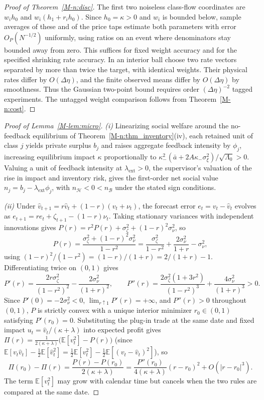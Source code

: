 \documentclass[12pt]{article}
\theoremstyle{definition}
\theoremstyle{remark}
\newcommand{\E}{\mathbb{E}}
\begin{document}
\begin{proof}[Proof of Theorem~\ref{M-n:disc}]
The first two noiseless class-flow coordinates are $w_i h_0$ and $w_i(h_1+r_i h_0)$. Since $h_0=\kappa>0$ and $w_i$ is bounded below, sample averages of these and of the price taps estimate both parameters with error $O_P(N^{-1/2})$ uniformly, using ratios on an event where denominators stay bounded away from zero. This suffices for fixed weight accuracy and for the specified shrinking rate accuracy. In an interior ball choose two rate vectors separated by more than twice the target, with identical weights. Their physical rates differ by $O(\Delta\eta)$, and the finite observed means differ by $O(\Delta\eta)$ by smoothness. Thus the Gaussian two-point bound requires order $(\Delta\eta)^{-2}$ tagged experiments. The untagged weight comparison follows from Theorem~\ref{M-n:cost}.
\end{proof}

\begin{proof}[Proof of Lemma~\ref{M-lem:micro}]
\emph{(i)} Linearizing social welfare around the no-feedback equilibrium of Theorem~\ref{M-n:thm_inventory}(iv), each retained unit of class $j$ yields private surplus $b_j$ and raises aggregate feedback intensity by $\phi_j$, increasing equilibrium impact $\kappa$ proportionally to $\kappa_-^2(\bar{a} + 2A\kappa_-\sigma_\xi^2)/\sqrt{\Lambda_0} > 0$. Valuing a unit of feedback intensity at $\lambda_{\mathrm{ext}} > 0$, the supervisor's valuation of the rise in impact and inventory risk, gives the first-order net social value $n_j = b_j - \lambda_{\mathrm{ext}}\phi_j$, with $n_{\mathcal{H}} < 0 < n_{\mathcal{B}}$ under the stated sign conditions.

\emph{(ii)} Under $\hat{v}_{t+1} = r \hat{v}_t + (1 - r)(v_t + \nu_t)$, the forecast error $e_t = v_t - \hat{v}_t$ evolves as $e_{t+1} = r e_t + \zeta_{t+1} - (1 - r)\nu_t$. Taking stationary variances with independent innovations gives $P(r) = r^2 P(r) + \sigma_\zeta^2 + (1 - r)^2 \sigma_\nu^2$, so
\[
  P(r) = \frac{\sigma_\zeta^2 + (1 - r)^2 \sigma_\nu^2}{1 - r^2}
       = \frac{\sigma_\zeta^2}{1 - r^2} + \frac{2\sigma_\nu^2}{1 + r} - \sigma_\nu^2,
\]
using $(1 - r)^2 / (1 - r^2) = (1 - r)/(1 + r) = 2/(1 + r) - 1$. Differentiating twice on $(0, 1)$ gives
\[
  P'(r) = \frac{2 r \sigma_\zeta^2}{(1 - r^2)^2} - \frac{2\sigma_\nu^2}{(1 + r)^2},
  \qquad
  P''(r) = \frac{2\sigma_\zeta^2(1 + 3r^2)}{(1 - r^2)^3} + \frac{4\sigma_\nu^2}{(1 + r)^3} > 0.
\]
Since $P'(0) = -2\sigma_\nu^2 < 0$, $\lim_{r \uparrow 1} P'(r) = +\infty$, and $P''(r) > 0$ throughout $(0, 1)$, $P$ is strictly convex with a unique interior minimizer $r_0 \in (0, 1)$ satisfying $P'(r_0) = 0$. Substituting the plug-in trade at the same date and fixed impact $u_t = \hat{v}_t / (\kappa + \lambda)$ into expected profit gives $\Pi(r) = \frac{1}{2(\kappa + \lambda)}\bigl(\E[v_t^2] - P(r)\bigr)$ (since $\E[v_t \hat{v}_t] - \frac{1}{2}\E[\hat{v}_t^2] = \frac{1}{2}\E[v_t^2] - \frac{1}{2}\E[(v_t - \hat{v}_t)^2]$), so
\[
  \Pi(r_0) - \Pi(r) = \frac{P(r) - P(r_0)}{2(\kappa + \lambda)}
  = \frac{P''(r_0)}{4(\kappa + \lambda)}(r - r_0)^2 + O\!\left(|r - r_0|^3\right).
\]
The term $\E[v_t^2]$ may grow with calendar time but cancels when the two rules are compared at the same date.
\end{proof}
\end{document}
